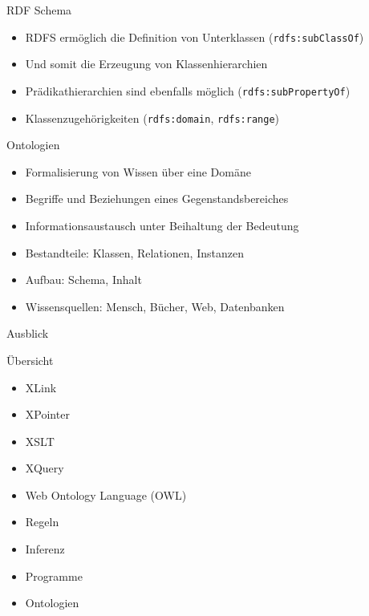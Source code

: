 \documentclass{beamer}
\begin{document}
\begin{frame}{RDF Schema}
	
	\begin{itemize}
		\item RDFS ermöglich die Definition von Unterklassen (\texttt{rdfs:subClassOf})
		\item Und somit die Erzeugung von Klassenhierarchien
		\item Prädikathierarchien sind ebenfalls möglich (\texttt{rdfs:subPropertyOf})
		\item Klassenzugehörigkeiten (\texttt{rdfs:domain}, \texttt{rdfs:range}) 
	\end{itemize}
	
\end{frame}

\begin{frame}{Ontologien}
	
	\begin{itemize}
		\item Formalisierung von Wissen über eine Domäne
		\item Begriffe und Beziehungen eines Gegenstandsbereiches
		\item Informationsaustausch unter Beihaltung der Bedeutung
		\item Bestandteile: Klassen, Relationen, Instanzen
		\item Aufbau: Schema, Inhalt
		\item Wissensquellen: Mensch, Bücher, Web, Datenbanken
	\end{itemize}
	
\end{frame}

\begin{frame}[plain]{}
	
	\huge
	\begin{center}
		Ausblick
	\end{center}
	
\end{frame}

\begin{frame}{Übersicht}
	
	\begin{itemize}
		\item XLink
		\item XPointer
		\item XSLT
		\item XQuery
		\item Web Ontology Language (OWL)
		\item Regeln
		\item Inferenz
		\item Programme
		\item Ontologien
	\end{itemize}
	
\end{frame}
\end{document}
